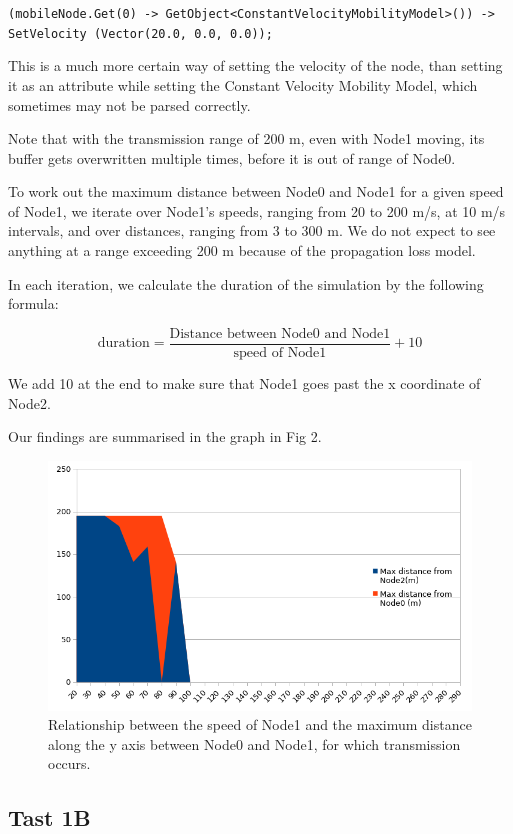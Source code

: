 \documentclass[11pt,journal]{article}
\begin{document}
	\texttt{(mobileNode.Get(0) -> GetObject<ConstantVelocityMobilityModel>()) -> SetVelocity (Vector(20.0, 0.0, 0.0));}
	
	This is a much more certain way of setting the velocity of the node, than setting it as an attribute while setting the Constant Velocity Mobility Model, which sometimes may not be parsed correctly.
		
	Note that with the transmission range of 200 m, even with Node1 moving, its buffer gets overwritten multiple times, before it is out of range of Node0.
	
	To work out the maximum distance between Node0 and Node1 for a given speed of Node1, we iterate over Node1's speeds, ranging from 20 to 200 m/s, at 10 m/s intervals, and over distances, ranging from 3 to 300 m. We do not expect to see anything at a range exceeding 200 m because of the propagation loss model. 
	
	In each iteration, we calculate the duration of the simulation by the following formula:
	
	\[\text{duration} = \dfrac{\text{Distance between Node0 and Node1}}{\text{speed of Node1}} + 10\]
	
	We add 10 at the end to make sure that Node1 goes past the x coordinate of Node2.
	
	Our findings are summarised in the graph in Fig 2.
	
	\begin{figure}[h]
		\centering
		\includegraphics[scale=0.7]{graph1a.png}
		\caption{Relationship between the speed of Node1 and the maximum distance along the y axis between Node0 and Node1, for which transmission occurs.}
	\end{figure}
	
	\subsection{Tast 1B}
	
\end{document}
